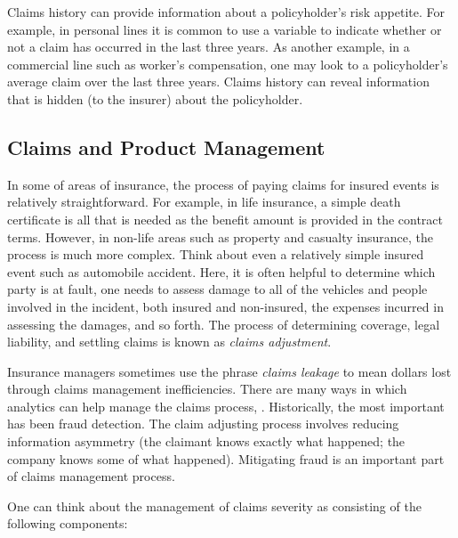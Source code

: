 \documentclass[]{book}
\begin{document}
Claims history can provide information about a policyholder's risk
appetite. For example, in personal lines it is common to use a variable
to indicate whether or not a claim has occurred in the last three years.
As another example, in a commercial line such as worker's compensation,
one may look to a policyholder's average claim over the last three
years. Claims history can reveal information that is hidden (to the
insurer) about the policyholder.

\subsection{Claims and Product
Management}\label{claims-and-product-management}

In some of areas of insurance, the process of paying claims for insured
events is relatively straightforward. For example, in life insurance, a
simple death certificate is all that is needed as the benefit amount is
provided in the contract terms. However, in non-life areas such as
property and casualty insurance, the process is much more complex. Think
about even a relatively simple insured event such as automobile
accident. Here, it is often helpful to determine which party is at
fault, one needs to assess damage to all of the vehicles and people
involved in the incident, both insured and non-insured, the expenses
incurred in assessing the damages, and so forth. The process of
determining coverage, legal liability, and settling claims is known as
\emph{claims adjustment}.

Insurance managers sometimes use the phrase \emph{claims leakage} to
mean dollars lost through claims management inefficiencies. There are
many ways in which analytics can help manage the claims process,
\citep{SASsurvey}. Historically, the most important has been fraud
detection. The claim adjusting process involves reducing information
asymmetry (the claimant knows exactly what happened; the company knows
some of what happened). Mitigating fraud is an important part of claims
management process.

One can think about the management of claims severity as consisting of
the following components:
\end{document}
